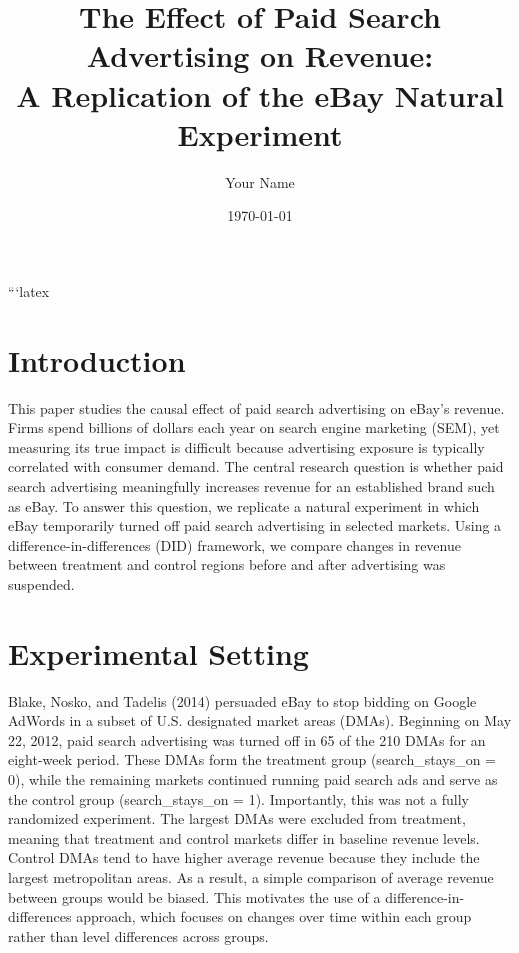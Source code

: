 ```latex \documentclass[12pt]{article} \usepackage[margin=1in]{geometry} \usepackage{graphicx} \usepackage{booktabs} \usepackage{amsmath}
\title{The Effect of Paid Search Advertising on Revenue: \\ A Replication of the eBay Natural Experiment} \author{Your Name} \date{\today}
\begin{document}
 \maketitle \section{Introduction} This paper studies the causal effect of paid search advertising on eBay’s revenue. Firms spend billions of dollars each year on search engine marketing (SEM),
 yet measuring its true impact is difficult because advertising exposure is typically correlated with consumer demand. The central research question is whether paid search advertising meaningfully increases revenue for an established brand such as eBay. To answer this question, we replicate a natural experiment in which eBay temporarily turned off paid search advertising in selected markets.
 Using a difference-in-differences (DID) framework, we compare changes in revenue between treatment and control regions before and after advertising was suspended. \section{Experimental Setting} Blake, Nosko, and Tadelis (2014) persuaded eBay to stop bidding on Google AdWords in a subset of U.S. designated market areas (DMAs). Beginning on May 22, 2012, paid search advertising was turned off in 65 of the 210 DMAs for an eight-week period. These DMAs form the treatment group (search\_stays\_on = 0),
 while the remaining markets continued running paid search ads and serve as the control group (search\_stays\_on = 1). Importantly, this was not a fully randomized experiment. The largest DMAs were excluded from treatment, meaning that treatment and control markets differ in baseline revenue levels. Control DMAs tend to have higher average revenue because they include the largest metropolitan areas.
 As a result, a simple comparison of average revenue between groups would be biased. This motivates the use of a difference-in-differences approach, which focuses on changes over time within each group rather than level differences across groups. 
\end{document}
